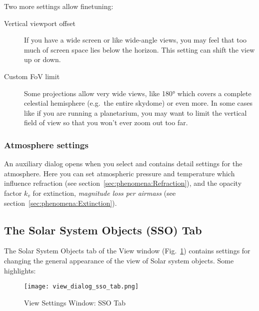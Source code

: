 \noindent Two more settings allow finetuning:
\begin{description}
\item[Vertical viewport offset] If you have a wide screen or like wide-angle views,
you may feel that too much of screen space lies below the horizon. This setting can shift the view up or down.
\item[Custom FoV limit] Some projections allow very wide views, like 180°
which covers a complete  celestial hemisphere (e.g.\ the entire skydome)
or even more. In some cases like if you are running a planetarium, you may want
to limit the vertical field of view so that you won't ever zoom out too far.
\end{description}

\subsubsection{Atmosphere settings}
\label{sec:gui:view:sky:atmosphere}

An auxiliary dialog opens when you select 
and contains detail settings for the atmosphere. Here
you can set atmospheric pressure and temperature which influence
refraction (see section~\ref{sec:phenomena:Refraction}), and the
opacity factor $k_v$ for extinction, \emph{magnitude loss per airmass} 
(see section~\ref{sec:phenomena:Extinction}).

\subsection{The Solar System Objects (SSO) Tab}
\label{sec:gui:view:sso}

The Solar System Objects tab of the View window (Fig.~\ref{fig:gui:view:sso}) contains settings
for changing the general appearance of the view of Solar system objects. Some highlights:

\begin{figure}[htbp]
\centering\texttt{[image: view\_dialog\_sso\_tab.png]}
\caption{View Settings Window: SSO Tab}
\label{fig:gui:view:sso}
\end{figure}


